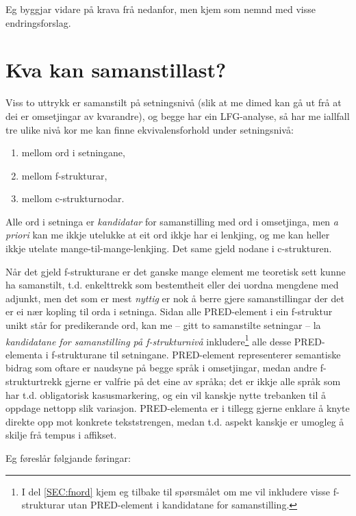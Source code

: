 \documentclass[11pt,a4paper,oneside,draft]{book}
\begin{document}
Eg byggjar vidare på krava frå \citet{thunes2003eal} nedanfor, men
kjem som nemnd med visse endringsforslag.

\section{Kva kan samanstillast?}
\label{sec-3.4}


Viss to uttrykk er samanstilt på setningsnivå (slik at me dimed kan gå
ut frå at dei er omsetjingar av kvarandre), og begge har ein
LFG-analyse, så har me iallfall tre ulike nivå kor me kan finne
ekvivalensforhold under setningsnivå:
\begin{enumerate}
\item mellom ord i setningane,
\item mellom f-strukturar,
\item mellom c-strukturnodar.
\end{enumerate}
Alle ord i setninga er \emph{kandidatar} for samanstilling med ord i
omsetjinga, men \emph{a priori} kan me ikkje utelukke at eit ord ikkje har ei
lenkjing, og me kan heller ikkje utelate mange-til-mange-lenkjing. Det
same gjeld nodane i c-strukturen.


Når det gjeld f-strukturane er det ganske mange element me teoretisk
sett kunne ha samanstilt, t.d. enkelttrekk som bestemtheit eller dei
uordna mengdene med adjunkt, men det som er mest \emph{nyttig} er nok å
berre gjere samanstillingar der det er ei nær kopling til orda i
setninga. Sidan alle PRED-element i ein f-struktur unikt står for
predikerande ord, kan me -- gitt to samanstilte setningar -- la
\emph{kandidatane for samanstilling på f-strukturnivå} inkludere\footnote{I del \ref{SEC:fnord} kjem eg tilbake til spørsmålet om me vil
        inkludere visse f-strukturar utan PRED-element i kandidatane
        for samanstilling. }
alle desse PRED-elementa i f-strukturane til setningane. PRED-element
representerer semantiske bidrag som oftare er naudsyne på begge språk i
omsetjingar, medan andre f-strukturtrekk gjerne er valfrie på det eine
av språka; det er ikkje alle språk som har t.d. obligatorisk
kasusmarkering, og ein vil kanskje nytte trebanken til å oppdage
nettopp slik variasjon.  PRED-elementa er i tillegg gjerne enklare å
knyte direkte opp mot konkrete tekststrengen, medan t.d. aspekt
kanskje er umogleg å skilje frå tempus i affikset.

Eg føreslår følgjande føringar:
\end{document}
